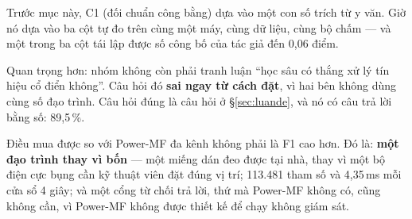 Trước mục này, C1 (đối chuẩn công bằng) dựa vào một con số trích từ y văn. Giờ nó dựa vào ba cột tự đo
trên cùng một máy, cùng dữ liệu, cùng bộ chấm --- và một trong ba cột tái lập được số công bố của tác
giả đến 0,06 điểm.

Quan trọng hơn: nhóm không còn phải tranh luận ``học sâu có thắng xử lý tín hiệu cổ điển không''. Câu
hỏi đó \textbf{sai ngay từ cách đặt}, vì hai bên không dùng cùng số đạo trình. Câu hỏi đúng là câu hỏi ở
\S\ref{sec:luande}, và nó có câu trả lời bằng số: 89,5\,\%.

Điều \hethong{} mua được so với Power-MF đa kênh không phải là F1 cao hơn. Đó là: \textbf{một đạo trình
thay vì bốn} --- một miếng dán đeo được tại nhà, thay vì một bộ điện cực bụng cần kỹ thuật viên đặt đúng
vị trí; 113.481 tham số và 4,35\,ms mỗi cửa sổ 4 giây; và một cổng từ chối trả lời, thứ mà Power-MF
không có, cũng không cần, vì Power-MF không được thiết kế để chạy không giám sát.
